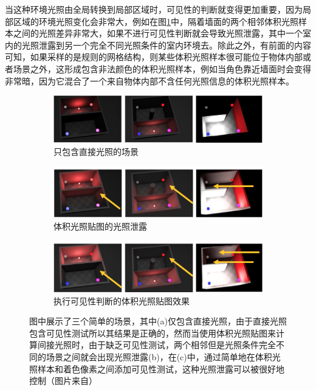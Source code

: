 当这种环境光照由全局转换到局部区域时，可见性的判断就变得更加重要，因为局部区域的环境光照变化会非常大，例如在图\ref{f:pl-reconstruction-comparation}中，隔着墙面的两个相邻体积光照样本之间的光照差异非常大，如果不进行可见性判断就会导致光照泄露，其中一个室内的光照泄露到另一个完全不同光照条件的室内环境去。除此之外，有前面的内容可知，如果采样的是规则的网格结构，则某些体积光照样本很可能位于物体内部或者场景之外，这形成包含非法颜色的体积光照样本，例如当角色靠近墙面时会变得非常暗，因为它混合了一个来自物体内部不含任何光照信息的体积光照样本。

\begin{figure}
\begin{fullwidth}
	\begin{subfigure}[b]{\thewidth}
		\includegraphics[width=\textwidth]{figures/pl/light-leaks-1}
		\caption{只包含直接光照的场景}
	\end{subfigure}
	\begin{subfigure}[b]{\thewidth}
		\includegraphics[width=\textwidth]{figures/pl/light-leaks-2}
			\caption{体积光照贴图的光照泄露}
	\end{subfigure}
	\begin{subfigure}[b]{\thewidth}
		\includegraphics[width=\textwidth]{figures/pl/light-leaks-3}
			\caption{执行可见性判断的体积光照贴图效果}
	\end{subfigure}
	\caption{图中展示了三个简单的场景，其中(a)仅包含直接光照，由于直接光照包含可见性测试所以其结果是正确的，然而当使用体积光照贴图来计算间接光照时，由于缺乏可见性测试，两个相邻但是光照条件完全不同的场景之间就会出现光照泄露(b)，在(c)中，通过简单地在体积光照样本和着色像素之间添加可见性测试，这种光照泄露可以被很好地控制（图片来自\cite{a:Lightprobeinterpolationusingtetrahedraltessellations}）}
	\label{f:pl-reconstruction-comparation}
\end{fullwidth}
\end{figure}


